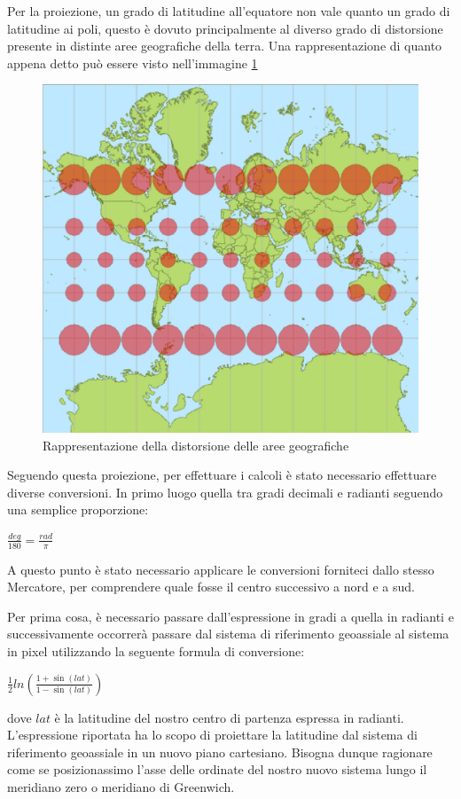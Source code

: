 Per la proiezione, un grado di latitudine all'equatore non vale quanto un grado di latitudine ai poli, questo è dovuto principalmente al diverso grado di distorsione presente in distinte aree geografiche della terra. Una rappresentazione di quanto appena detto può essere visto nell'immagine \ref{fig:mercatorproj}
\begin{figure}[H]
	\centering
	\includegraphics[scale=0.5]{figure/mercatorproj.eps}
	\caption{Rappresentazione della distorsione delle aree geografiche}\label{fig:mercatorproj}
\end{figure}

Seguendo questa proiezione, per effettuare i calcoli è stato necessario effettuare diverse conversioni. In primo luogo quella tra gradi decimali e radianti seguendo una semplice proporzione:
\begin{center}

	\Large$ \frac{deg}{180} = \frac{rad}{\pi} $\par

\end{center}

A questo punto è stato necessario applicare le conversioni forniteci dallo stesso Mercatore, per comprendere quale fosse il centro successivo a nord e a sud. 

Per prima cosa, è necessario passare dall'espressione in gradi a quella in radianti e successivamente occorrerà passare dal sistema di riferimento geoassiale al sistema in pixel utilizzando la seguente formula di conversione:
\begin{center}

	\Large$ \frac{1}{2}ln(\frac{1+\sin(lat)}{1-\sin(lat)}) $\par

\end{center}
dove $lat$ è la latitudine del nostro centro di partenza espressa in radianti. L'espressione riportata ha lo scopo di proiettare la latitudine dal sistema di riferimento geoassiale in un nuovo piano cartesiano. Bisogna dunque ragionare come se posizionassimo l'asse delle ordinate del nostro nuovo sistema lungo il meridiano zero o meridiano di Greenwich.

